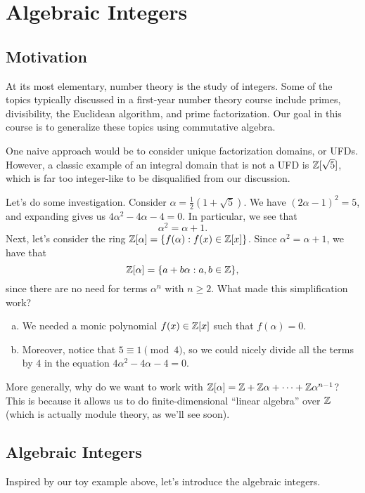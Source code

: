 \section{Algebraic Integers}\label{sec:1}

\subsection{Motivation}\label{subsec:1.1}
At its most elementary, number theory is the study of integers. Some of the 
topics typically discussed in a first-year number theory course 
include primes, divisibility, the Euclidean algorithm, and prime factorization.
Our goal in this course is to generalize 
these topics using commutative algebra. 

One naive approach would be to consider unique factorization domains, or 
UFDs. However, a classic example of an integral domain
that is not a UFD is $\mathbb{Z}[\sqrt{5}]$, which is far too integer-like 
to be disqualified from our discussion. 

Let's do some investigation. Consider $\alpha = \frac12(1 + \sqrt{5})$. We have 
$(2\alpha - 1)^2 = 5$, and expanding gives us $4\alpha^2 - 4\alpha - 4 = 0$. 
In particular, we see that 
\[ \alpha^2 = \alpha + 1. \] 
Next, let's consider the ring $\mathbb{Z}[\alpha] = \{f(\alpha) : f(x) \in \mathbb{Z}[x]\}$. 
Since $\alpha^2 = \alpha + 1$, we have that
\[ \mathbb{Z}[\alpha] = \{a + b\alpha : a, b \in \mathbb{Z}\}, \] 
since there are no need for terms $\alpha^n$ with $n \geq 2$. What made 
this simplification work? 
\begin{enumerate}[(a)]
    \item We needed a monic polynomial $f(x) \in \mathbb{Z}[x]$ such that $f(\alpha) = 0$. 
    \item Moreover, notice that $5 \equiv 1 \pmod 4$, so we could nicely 
    divide all the terms by $4$ in the equation $4\alpha^2 - 4\alpha - 4 = 0$. 
\end{enumerate}
More generally, why do we want to work with $\mathbb{Z}[\alpha] = \mathbb{Z} + \mathbb{Z}\alpha 
+ \cdots + \mathbb{Z}\alpha^{n-1}$? This is because it allows us to do 
finite-dimensional ``linear algebra'' over $\mathbb{Z}$ (which is actually module 
theory, as we'll see soon).

\subsection{Algebraic Integers}\label{subsec:1.2}
Inspired by our toy example above, let's introduce the algebraic integers.

